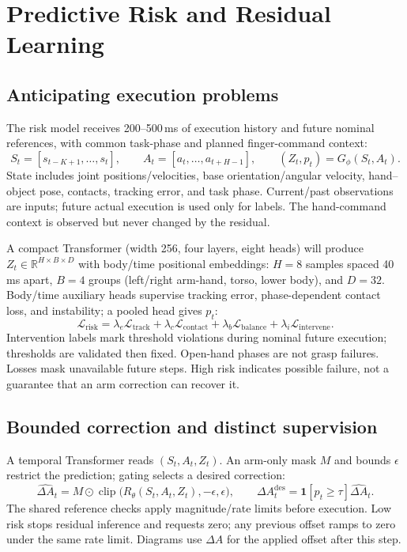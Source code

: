 \documentclass[11pt,a4paper]{article}
\newcommand{\R}{\mathbb{R}}
\begin{document}
\clearpage
\section{Predictive Risk and Residual Learning}
\subsection{Anticipating execution problems}
The risk model receives 200--500\,ms of execution history and future nominal
references, with common task-phase and planned finger-command context:
\[
S_t=[s_{t-K+1},\ldots,s_t],\qquad A_t=[a_t,\ldots,a_{t+H-1}],
\qquad (Z_t,p_t)=G_\phi(S_t,A_t).
\]
State includes joint positions/velocities, base orientation/angular velocity,
hand--object pose, contacts, tracking error, and task phase. Current/past
observations are inputs; future actual execution is used only for labels.
The hand-command context is observed but never changed by the residual.

A compact Transformer (width 256, four layers, eight heads) will produce
$Z_t\in\R^{H\times B\times D}$ with body/time positional embeddings:
$H=8$ samples spaced 40\,ms apart, $B=4$ groups (left/right arm-hand, torso,
lower body), and $D=32$. Body/time auxiliary heads supervise tracking error,
phase-dependent contact loss, and instability; a pooled head gives $p_t$:
\[
\mathcal L_{\mathrm{risk}}=
\lambda_e\mathcal L_{\mathrm{track}}+
\lambda_c\mathcal L_{\mathrm{contact}}+
\lambda_b\mathcal L_{\mathrm{balance}}+
\lambda_i\mathcal L_{\mathrm{intervene}}.
\]
Intervention labels mark threshold violations during nominal future execution;
thresholds are validated then fixed. Open-hand phases are not grasp failures.
Losses mask unavailable future steps. High risk indicates possible failure,
not a guarantee that an arm correction can recover it.

\subsection{Bounded correction and distinct supervision}
A temporal Transformer reads $(S_t,A_t,Z_t)$. An arm-only mask $M$ and bounds
$\epsilon$ restrict the prediction; gating selects a desired correction:
\[
\widehat{\Delta A}_t=M\odot\operatorname{clip}
\bigl(R_\theta(S_t,A_t,Z_t),-\epsilon,\epsilon\bigr),\qquad
\Delta A_t^{\mathrm{des}}=\mathbf{1}[p_t\geq\tau]\widehat{\Delta A}_t.
\]
The shared reference checks apply magnitude/rate limits before execution.
Low risk stops residual inference and requests zero; any previous offset
ramps to zero under the same rate limit. Diagrams use $\Delta A$ for the
applied offset after this step.
\end{document}

